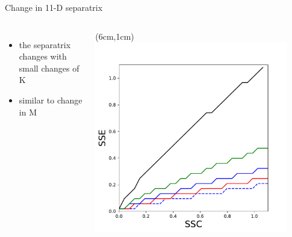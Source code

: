 \documentclass[15pt]{beamer}
\begin{document}
\begin{frame}{Change in 11-D separatrix}
\begin{columns}
\begin{itemize}
	\item the separatrix changes with small changes of K
	\item similar to change in M
\end{itemize}
	
	\begin{textblock*}{8cm}(6cm,1cm) %
	 \includegraphics[width=0.9\textwidth]{delta_K_separatrix}
	\end{textblock*}
\end{columns}
\end{frame}
\end{document}
